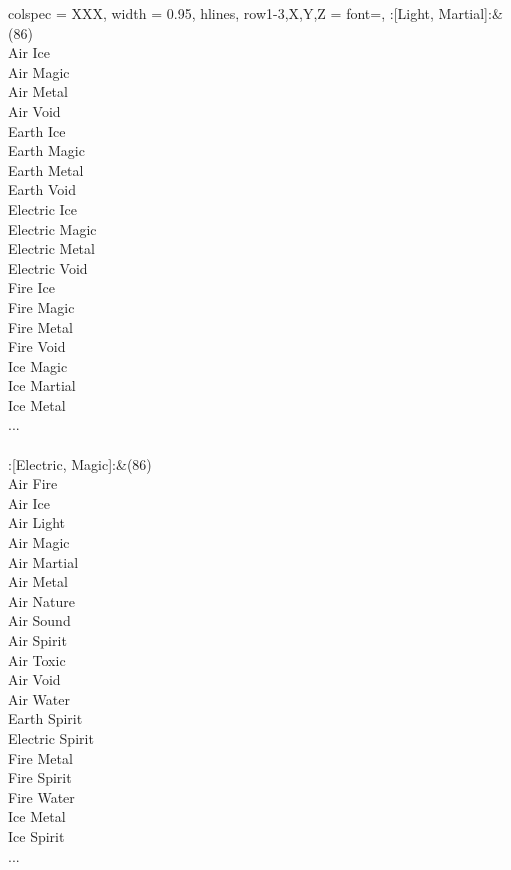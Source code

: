 \begin{longtblr}[
	caption = {2v2 Attacking Effective},
	label = {2v2-Attacking-Effective},
]{
	colspec = {XXX}, width = 0.95\linewidth,
	hlines,
	row{1-3,X,Y,Z} = {font=\bfseries},
}
	:[Light, Martial]:&{(86)\\
	Air Ice \\
	Air Magic \\
	Air Metal \\
	Air Void \\
	Earth Ice \\
	Earth Magic \\
	Earth Metal \\
	Earth Void \\
	Electric Ice \\
	Electric Magic \\
	Electric Metal \\
	Electric Void \\
	Fire Ice \\
	Fire Magic \\
	Fire Metal \\
	Fire Void \\
	Ice Magic \\
	Ice Martial \\
	Ice Metal \\
	...\\
	}\\

	:[Electric, Magic]:&{(86)\\
	Air Fire \\
	Air Ice \\
	Air Light \\
	Air Magic \\
	Air Martial \\
	Air Metal \\
	Air Nature \\
	Air Sound \\
	Air Spirit \\
	Air Toxic \\
	Air Void \\
	Air Water \\
	Earth Spirit \\
	Electric Spirit \\
	Fire Metal \\
	Fire Spirit \\
	Fire Water \\
	Ice Metal \\
	Ice Spirit \\
	...\\
	}\\


\end{longtblr}
